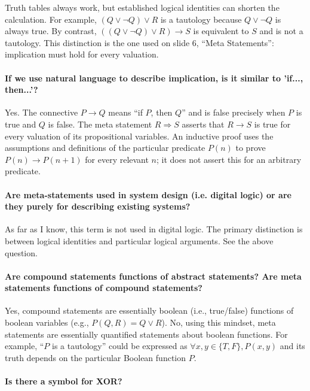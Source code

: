 \documentclass[10pt,english]{article}
\begin{document}
Truth tables always work, but established logical identities can shorten the calculation.
For example, $(Q\vee\neg Q)\vee R$ is a tautology because $Q\vee\neg Q$ is always true.
By contrast, $((Q\vee\neg Q)\vee R)\to S$ is equivalent to $S$ and is not a tautology.
This distinction is the one used on slide 6, ``Meta Statements'': implication must hold for every valuation.


\paragraph{If we use natural language to describe implication, is it similar to 'if..., then...'?}


Yes. The connective $P\to Q$ means ``if $P$, then $Q$'' and is false precisely when $P$ is true and $Q$ is false.
The meta statement $R\Rightarrow S$ asserts that $R\to S$ is true for every valuation of its propositional variables.
An inductive proof uses the assumptions and definitions of the particular predicate $P(n)$ to prove $P(n)\to P(n+1)$ for every relevant $n$; it does not assert this for an arbitrary predicate.


\paragraph{Are meta-statements used in system design (i.e. digital logic) or are they purely for describing existing systems?}

As far as I know, this term is not used in digital logic.  The primary  distinction is between logical identities and particular logical arguments.  See the above question.

\paragraph{Are compound statements functions of abstract statements? Are meta statements functions of compound statements?}

Yes, compound statements are essentially boolean (i.e., true/false) functions of boolean variables (e.g., $P(Q,R) = Q \vee R$). No, using this mindset, meta statements are essentially quantified statements about boolean functions.  For example, ``$P$ is a tautology'' could be expressed as $\forall x,y\in \{T,F\}, P(x,y)$ and its truth depends on the particular Boolean function $P$.

\paragraph{Is there a symbol for XOR?}
\end{document}
